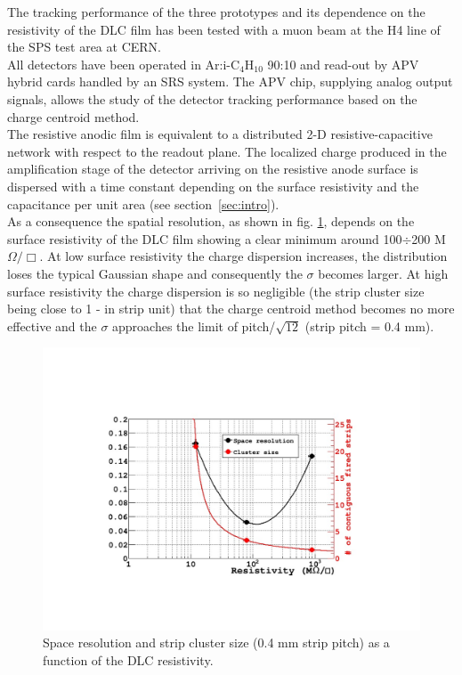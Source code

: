 The tracking performance of the three prototypes and its dependence on the resistivity of the DLC film has been tested with a muon beam at the H4 line of the SPS test area at CERN.\\
All detectors have been operated in Ar:i-C$_{4}$H$_{10}$ 90:10 and read-out by APV hybrid cards \cite{apv} handled by an SRS system. The APV chip, supplying analog output signals, allows the study of the detector tracking performance based on the charge centroid method.\\
The resistive anodic film is equivalent to a distributed 2-D resistive-capacitive network with respect to the readout plane.
The localized charge produced in the amplification stage of the detector arriving on the resistive anode surface is dispersed with a time constant depending on the surface resistivity and the capacitance per unit area (see section~\ref{sec:intro}).\\
As a consequence the spatial resolution, as shown in fig. \ref{rho_res}, depends on the surface resistivity of the DLC film showing a clear minimum around 100$\div$200 M$\Omega/\Box$.
At low surface resistivity the charge dispersion increases, the distribution loses the typical Gaussian shape and consequently the $\sigma$  becomes larger. At high surface resistivity the charge dispersion is so negligible (the strip cluster size being close to 1 - in strip unit) that the charge centroid method becomes no more effective and the $\sigma$ approaches the limit of pitch/$\sqrt{12}$ (strip pitch = 0.4 mm).\\
%
\begin{figure}[h]
\centering
    	\includegraphics[scale=0.35]{Figures/Muon/microrwell-space-resolution_vs_rho.pdf}
        \caption{Space resolution and strip cluster size (0.4 mm strip pitch) as a function of the DLC resistivity.}
        \label{rho_res}
\end{figure}
%
%

